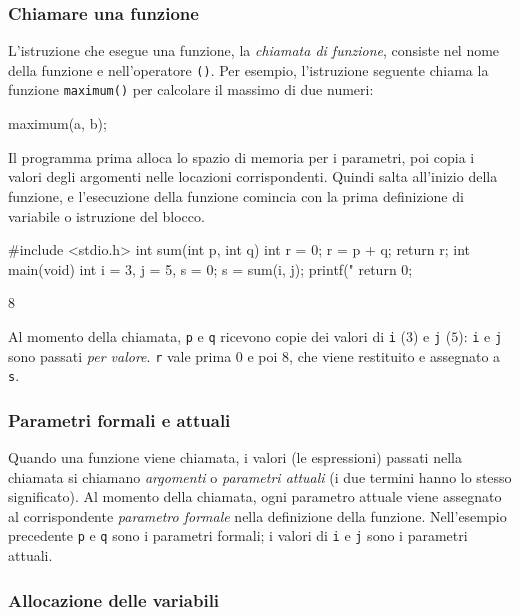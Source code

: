 \documentclass[11pt,a4paper]{article}
\begin{document}
\subsubsection{Chiamare una funzione}

L'istruzione che esegue una funzione, la \emph{chiamata di funzione}, consiste nel nome della funzione e nell'operatore \lstinline|()|. Per esempio, l'istruzione seguente chiama la funzione \lstinline|maximum()| per calcolare il massimo di due numeri:
\begin{codice}
maximum(a, b);
\end{codice}
Il programma prima alloca lo spazio di memoria per i parametri, poi copia i valori degli argomenti nelle locazioni corrispondenti. Quindi salta all'inizio della funzione, e l'esecuzione della funzione comincia con la prima definizione di variabile o istruzione del blocco.

\begin{esempio}
\begin{codice}
#include <stdio.h>
int sum(int p, int q) {
    int r = 0;
    r = p + q;
    return r;
}
int main(void) {
    int i = 3, j = 5, s = 0;
    s = sum(i, j);
    printf("%
    return 0;
}
\end{codice}
\begin{risultato}
8
\end{risultato}
Al momento della chiamata, \lstinline|p| e \lstinline|q| ricevono copie dei valori di \lstinline|i| ($3$) e \lstinline|j| ($5$): \lstinline|i| e \lstinline|j| sono passati \emph{per valore}. \lstinline|r| vale prima $0$ e poi $8$, che viene restituito e assegnato a \lstinline|s|.
\end{esempio}

\subsubsection{Parametri formali e attuali}

Quando una funzione viene chiamata, i valori (le espressioni) passati nella chiamata si chiamano \emph{argomenti} o \emph{parametri attuali} (i due termini hanno lo stesso significato). Al momento della chiamata, ogni parametro attuale viene assegnato al corrispondente \emph{parametro formale} nella definizione della funzione. Nell'esempio precedente \lstinline|p| e \lstinline|q| sono i parametri formali; i valori di \lstinline|i| e \lstinline|j| sono i parametri attuali.

\subsubsection{Allocazione delle variabili}
\end{document}
